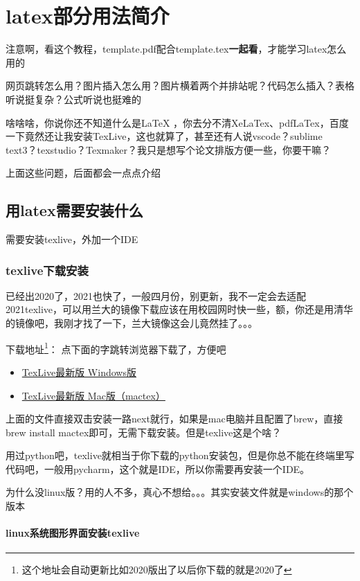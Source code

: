 \documentclass[AutoFakeBold]{template/LZUThesis2021_master}
\begin{document}
\chapter{latex部分用法简介}

注意啊，看这个教程，template.pdf配合template.tex\textbf{一起看}，才能学习latex怎么用的

网页跳转怎么用？图片插入怎么用？图片横着两个并排站呢？代码怎么插入？表格听说挺复杂？公式听说也挺难的

啥啥啥，你说你还不知道什么是LaTeX ，你去分不清XeLaTex、pdfLaTex，百度一下竟然还让我安装TexLive，这也就算了，甚至还有人说vscode？sublime text3？texstudio？Texmaker？我只是想写个论文排版方便一些，你要干嘛？

上面这些问题，后面都会一点点介绍

\section{用latex需要安装什么}
需要安装texlive，外加一个IDE

\subsection{texlive下载安装}
已经出2020了，2021也快了，一般四月份，别更新，我不一定会去适配2021texlive，可以用兰大的镜像下载应该在用校园网时快一些，额，你还是用清华的镜像吧，我刚才找了一下，兰大镜像这会儿竟然挂了。。。

下载地址\footnote{这个地址会自动更新比如2020版出了以后你下载的就是2020了}： 点下面的字跳转浏览器下载了，方便吧

\begin{itemize}
	\item \href{https://mirrors.tuna.tsinghua.edu.cn/CTAN/systems/texlive/Images/texlive.iso}{TexLive最新版 \quad Windows版}
	\item \href{http://tug.org/cgi-bin/mactex-download/MacTeX.pkg}{TexLive最新版 \quad Mac版（mactex）}
\end{itemize}

上面的文件直接双击安装一路next就行，如果是mac电脑并且配置了brew，直接brew install mactex即可，无需下载安装。但是texlive这是个啥？

用过python吧，texlive就相当于你下载的python安装包，但是你总不能在终端里写代码吧，一般用pycharm，这个就是IDE，所以你需要再安装一个IDE。


为什么没linux版？用的人不多，真心不想给。。。其实安装文件就是windows的那个版本

\subsubsection{linux系统图形界面安装texlive} %
\label{ssub:linux图形界面安装方式}
\end{document}
